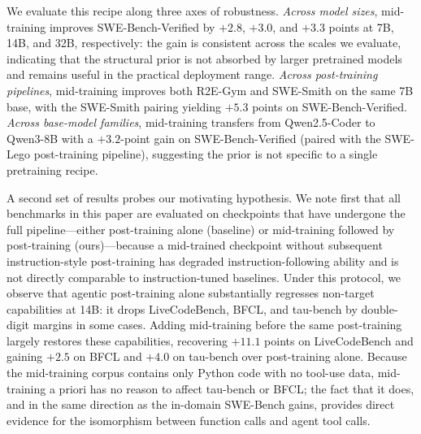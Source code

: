 We evaluate this recipe along three axes of robustness. \emph{Across model
sizes}, mid-training improves SWE-Bench-Verified by $+2.8$, $+3.0$, and
$+3.3$ points at 7B, 14B, and 32B, respectively: the gain is consistent
across the scales we evaluate, indicating that the structural prior is not
absorbed by larger pretrained models and remains useful in the practical
deployment range. \emph{Across post-training pipelines}, mid-training
improves both R2E-Gym and SWE-Smith on the same 7B base, with the SWE-Smith
pairing yielding $+5.3$ points on SWE-Bench-Verified.
\emph{Across base-model families}, mid-training transfers from
Qwen2.5-Coder to Qwen3-8B with a $+3.2$-point gain on SWE-Bench-Verified
(paired with the SWE-Lego post-training pipeline), suggesting the prior is
not specific to a single pretraining recipe.

A second set of results probes our motivating hypothesis. We note first
that all benchmarks in this paper are evaluated on checkpoints that have
undergone the full pipeline---either post-training alone (baseline) or
mid-training followed by post-training (ours)---because a mid-trained
checkpoint without subsequent instruction-style post-training has degraded
instruction-following ability and is not directly comparable to
instruction-tuned baselines. Under this protocol, we observe that agentic
post-training alone substantially regresses non-target capabilities at
14B: it drops LiveCodeBench, BFCL, and tau-bench by double-digit margins
in some cases. Adding mid-training before the same post-training largely
restores these capabilities, recovering $+11.1$ points on LiveCodeBench
and gaining $+2.5$ on BFCL and $+4.0$ on tau-bench over post-training
alone. Because the mid-training corpus contains only Python code with no
tool-use data, mid-training a priori has no reason to affect tau-bench or
BFCL; the fact that it does, and in the same direction as the in-domain
SWE-Bench gains, provides direct evidence for the isomorphism between
function calls and agent tool calls.

